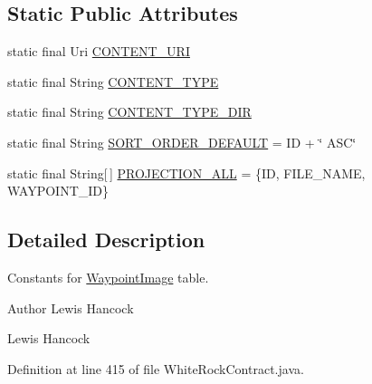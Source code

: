 \subsection*{Static Public Attributes}
\begin{DoxyCompactItemize}
\item 
static final Uri \hyperlink{classuk_1_1ac_1_1swan_1_1digitaltrails_1_1database_1_1_white_rock_contract_1_1_waypoint_image_a4701d2421c1748bb4047144246e56a99}{C\+O\+N\+T\+E\+N\+T\+\_\+\+U\+R\+I}
\item 
static final String \hyperlink{classuk_1_1ac_1_1swan_1_1digitaltrails_1_1database_1_1_white_rock_contract_1_1_waypoint_image_a11c8f3afb103ca0123008a3cbf61e6a1}{C\+O\+N\+T\+E\+N\+T\+\_\+\+T\+Y\+P\+E}
\item 
static final String \hyperlink{classuk_1_1ac_1_1swan_1_1digitaltrails_1_1database_1_1_white_rock_contract_1_1_waypoint_image_ae9b3cb4696bf5eeb848ac36e88ae7204}{C\+O\+N\+T\+E\+N\+T\+\_\+\+T\+Y\+P\+E\+\_\+\+D\+I\+R}
\item 
static final String \hyperlink{classuk_1_1ac_1_1swan_1_1digitaltrails_1_1database_1_1_white_rock_contract_1_1_waypoint_image_aa500f49ec782da034cbe23934e723318}{S\+O\+R\+T\+\_\+\+O\+R\+D\+E\+R\+\_\+\+D\+E\+F\+A\+U\+L\+T} = I\+D + \char`\"{} A\+S\+C\char`\"{}
\item 
static final String\mbox{[}$\,$\mbox{]} \hyperlink{classuk_1_1ac_1_1swan_1_1digitaltrails_1_1database_1_1_white_rock_contract_1_1_waypoint_image_aa3ccacc41ef3b1d308fda3b04c6fbcd7}{P\+R\+O\+J\+E\+C\+T\+I\+O\+N\+\_\+\+A\+L\+L} = \{I\+D, F\+I\+L\+E\+\_\+\+N\+A\+M\+E, W\+A\+Y\+P\+O\+I\+N\+T\+\_\+\+I\+D\}
\end{DoxyCompactItemize}


\subsection{Detailed Description}
Constants for \hyperlink{classuk_1_1ac_1_1swan_1_1digitaltrails_1_1database_1_1_white_rock_contract_1_1_waypoint_image}{Waypoint\+Image} table. 

\begin{DoxyAuthor}{Author}
Lewis Hancock 

Lewis Hancock 
\end{DoxyAuthor}


Definition at line 415 of file White\+Rock\+Contract.\+java.



